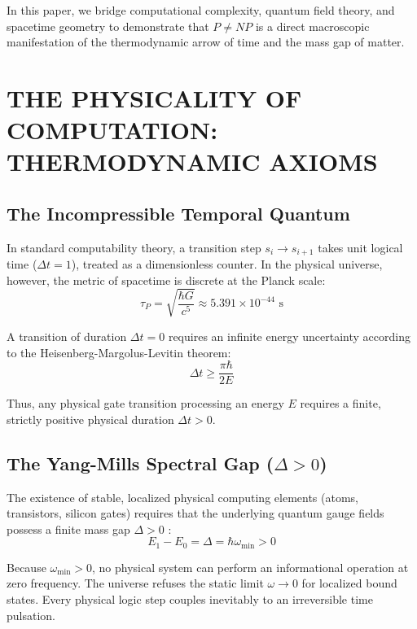 \documentclass[10pt,twocolumn]{article}
\begin{document}
In this paper, we bridge computational complexity, quantum field theory, and spacetime geometry to demonstrate that $P \neq NP$ is a direct macroscopic manifestation of the thermodynamic arrow of time and the mass gap of matter.



\section{THE PHYSICALITY OF COMPUTATION: THERMODYNAMIC AXIOMS}


\subsection{The Incompressible Temporal Quantum}

In standard computability theory, a transition step $s_i \to s_{i+1}$ takes unit logical time ($\Delta t = 1$), treated as a dimensionless counter. In the physical universe, however, the metric of spacetime is discrete at the Planck scale:
\begin{equation}
  \tau_P = \sqrt{\frac{\hbar G}{c^5}} \approx 5.391 \times 10^{-44} \text{ s}
\end{equation}

A transition of duration $\Delta t = 0$ requires an infinite energy uncertainty according to the Heisenberg-Margolus-Levitin theorem:
\begin{equation}
  \Delta t \ge \frac{\pi \hbar}{2 E}
\end{equation}

Thus, any physical gate transition processing an energy $E$ requires a finite, strictly positive physical duration $\Delta t > 0$.


\subsection{The Yang-Mills Spectral Gap ($\Delta > 0$)}

The existence of stable, localized physical computing elements (atoms, transistors, silicon gates) requires that the underlying quantum gauge fields possess a finite mass gap $\Delta > 0$ \cite{Jaffe2000}:
\begin{equation}
  E_1 - E_0 = \Delta = \hbar \omega_{\text{min}} > 0
\end{equation}

Because $\omega_{\text{min}} > 0$, no physical system can perform an informational operation at zero frequency. The universe refuses the static limit $\omega \to 0$ for localized bound states. Every physical logic step couples inevitably to an irreversible time pulsation.
\end{document}
